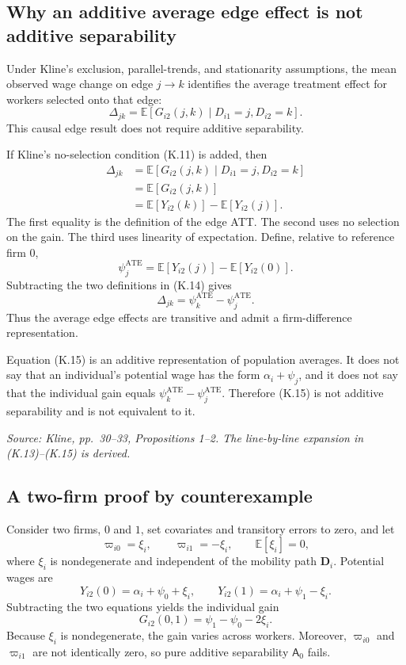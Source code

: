 \documentclass[11pt]{article}
\begin{document}
\subsection{Why an additive average edge effect is not additive separability}

Under Kline's exclusion, parallel-trends, and stationarity assumptions, the
mean observed wage change on edge \(j\to k\) identifies the average
treatment effect for workers selected onto that edge:
\[
\Delta_{jk}
=
\mathbb E[
G_{i2}(j,k)
\mid D_{i1}=j,D_{i2}=k].
\tag{K.12}
\]
This causal edge result does not require additive separability.

If Kline's no-selection condition (K.11) is added, then
\[
\begin{aligned}
\Delta_{jk}
&=
\mathbb E[
G_{i2}(j,k)
\mid D_{i1}=j,D_{i2}=k]\\
&=
\mathbb E[G_{i2}(j,k)]\\
&=
\mathbb E[Y_{i2}(k)]
-\mathbb E[Y_{i2}(j)].
\end{aligned}
\tag{K.13}
\]
The first equality is the definition of the edge ATT.  The second uses
no selection on the gain.  The third uses linearity of expectation.
Define, relative to reference firm \(0\),
\[
\psi_j^{\mathrm{ATE}}
=
\mathbb E[Y_{i2}(j)]
-\mathbb E[Y_{i2}(0)].
\tag{K.14}
\]
Subtracting the two definitions in (K.14) gives
\[
\Delta_{jk}
=
\psi_k^{\mathrm{ATE}}
-\psi_j^{\mathrm{ATE}}.
\tag{K.15}
\]
Thus the average edge effects are transitive and admit a firm-difference
representation.

Equation (K.15) is an additive representation of population averages.  It
does not say that an individual's potential wage has the form
\(\alpha_i+\psi_j\), and it does not say that the individual gain equals
\(\psi_k^{\mathrm{ATE}}-\psi_j^{\mathrm{ATE}}\).  Therefore (K.15) is not
additive separability and is not equivalent to it.

\textit{Source: Kline, pp.\ 30--33, Propositions 1--2.  The line-by-line
expansion in (K.13)--(K.15) is derived.}

\subsection{A two-firm proof by counterexample}

Consider two firms, \(0\) and \(1\), set covariates and transitory errors to
zero, and let
\[
\varpi_{i0}=\xi_i,
\qquad
\varpi_{i1}=-\xi_i,
\qquad
\mathbb E[\xi_i]=0,
\tag{K.16}
\]
where \(\xi_i\) is nondegenerate and independent of the mobility path
\(\mathbf D_i\).  Potential wages are
\[
Y_{i2}(0)=\alpha_i+\psi_0+\xi_i,
\qquad
Y_{i2}(1)=\alpha_i+\psi_1-\xi_i.
\tag{K.17}
\]
Subtracting the two equations yields the individual gain
\[
G_{i2}(0,1)
=
\psi_1-\psi_0-2\xi_i.
\tag{K.18}
\]
Because \(\xi_i\) is nondegenerate, the gain varies across workers.
Moreover, \(\varpi_{i0}\) and \(\varpi_{i1}\) are not identically zero, so
pure additive separability \(\mathsf A_0\) fails.
\end{document}
